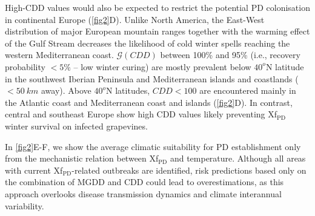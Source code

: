     High-CDD values would also be expected to restrict the potential PD
    colonisation in continental Europe (\cref{fig2}D). Unlike North America,
    the
    East-West distribution of major European mountain ranges together with the
    warming effect of the Gulf Stream decreases the likelihood of cold winter
    spells reaching the western Mediterranean coast. $\mathcal{G}(CDD)$ between
    100\% and 95\% (i.e., recovery probability $<5\%$ -- low winter curing) are
    mostly prevalent below $40^o$N latitude in the southwest Iberian Peninsula
    and
    Mediterranean islands and coastlands ($<\SI{50}{km}$ away). Above $40^o$N
    latitudes, $CDD < 100$ are encountered mainly in the Atlantic coast and
    Mediterranean coast and islands (\cref{fig2}D). In contrast, central and
    southeast Europe show high CDD values likely preventing Xf$_{\textrm{PD}}$
    winter survival on infected grapevines.

    In \cref{fig2}E-F, we show the average climatic suitability for PD
    establishment only from the mechanistic relation between Xf$_{\textrm{PD}}$
    and
    temperature. Although all areas with current Xf$_{\textrm{PD}}$-related
    outbreaks are identified, risk predictions based only on the combination of
    MGDD and CDD could lead to overestimations, as this approach overlooks
    disease
    transmission dynamics and climate interannual variability.

